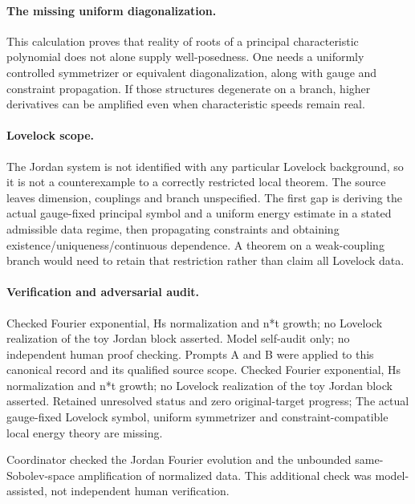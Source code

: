 \documentclass[11pt]{article}
\begin{document}
\paragraph{The missing uniform diagonalization.} This calculation proves that reality of roots of a principal characteristic polynomial does not alone supply well-posedness. One needs a uniformly controlled symmetrizer or equivalent diagonalization, along with gauge and constraint propagation. If those structures degenerate on a branch, higher derivatives can be amplified even when characteristic speeds remain real.

\paragraph{Lovelock scope.} The Jordan system is not identified with any particular Lovelock background, so it is not a counterexample to a correctly restricted local theorem. The source leaves dimension, couplings and branch unspecified. The first gap is deriving the actual gauge-fixed principal symbol and a uniform energy estimate in a stated admissible data regime, then propagating constraints and obtaining existence/uniqueness/continuous dependence. A theorem on a weak-coupling branch would need to retain that restriction rather than claim all Lovelock data.

\paragraph{Verification and adversarial audit.}
Checked Fourier exponential, Hs normalization and n*t growth; no Lovelock realization of the toy Jordan block asserted. Model self-audit only; no independent human proof checking. Prompts A and B were applied to this canonical record and its qualified source scope. Checked Fourier exponential, Hs normalization and n*t growth; no Lovelock realization of the toy Jordan block asserted. Retained unresolved status and zero original-target progress; The actual gauge-fixed Lovelock symbol, uniform symmetrizer and constraint-compatible local energy theory are missing.

Coordinator checked the Jordan Fourier evolution and the unbounded same-Sobolev-space amplification of normalized data. This additional check was model-assisted, not independent human verification.
\end{document}
